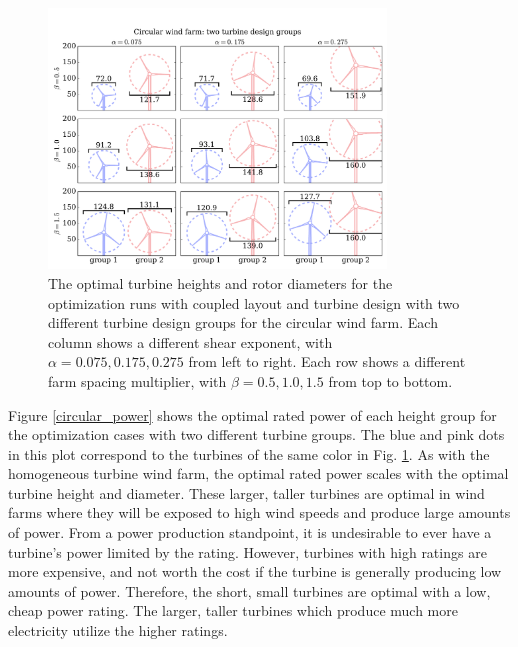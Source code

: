 \begin{figure}[htbp]
  \centering
  \includegraphics[trim={0.5cm 0.3cm 0.3cm 1.75cm},clip,width=0.8\textwidth]{Figures/turbineSizesCircular_2.pdf}
  \caption{\label{circular_turbines} The optimal turbine heights and rotor diameters for the optimization runs with coupled layout and turbine design with two different turbine design groups for the circular wind farm. Each column shows a different shear exponent, with $\alpha=0.075,0.175,0.275$ from left to right. Each row shows a different farm spacing multiplier, with $\beta=0.5,1.0,1.5$ from top to bottom.}
\end{figure}


Figure \ref{circular_power} shows the optimal rated power of each height group for the optimization cases with two different turbine groups. The blue and pink dots in this plot correspond to the turbines of the same color in Fig. \ref{circular_turbines}. As with the homogeneous turbine wind farm, the optimal rated power scales with the optimal turbine height and diameter. These larger, taller turbines are optimal in wind farms where they will be exposed to high wind speeds and produce large amounts of power. From a power production standpoint, it is undesirable to ever have a turbine's power limited by the rating. However, turbines with high ratings are more expensive, and not worth the cost if the turbine is generally producing low amounts of power. Therefore, the short, small turbines are optimal with a low, cheap power rating. The larger, taller turbines which produce much more electricity utilize the higher ratings. 


